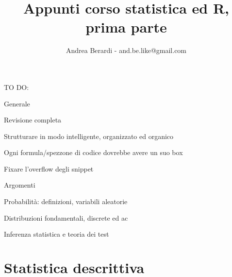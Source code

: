 \documentclass[a4paper]{article}
\title{Appunti corso statistica ed R, prima parte}
\author{Andrea Berardi - and.be.like@gmail.com}
\begin{document}

\maketitle

TO DO:
\begin{list}{*}{}
\item Generale
\begin{list}{-}{}
\item Revisione completa
\item Strutturare in modo intelligente, organizzato ed organico
\item Ogni formula/spezzone di codice dovrebbe avere un suo box
\item Fixare l'overflow degli snippet
\end{list}
\item Argomenti
\begin{list}{-}{}
\item Probabilit\`{a}: definizioni, variabili aleatorie
\item Distribuzioni fondamentali, discrete ed ac
\item Inferenza statistica e teoria dei test
\end{list}
\end{list}




\section{Statistica descrittiva}
\end{document}

